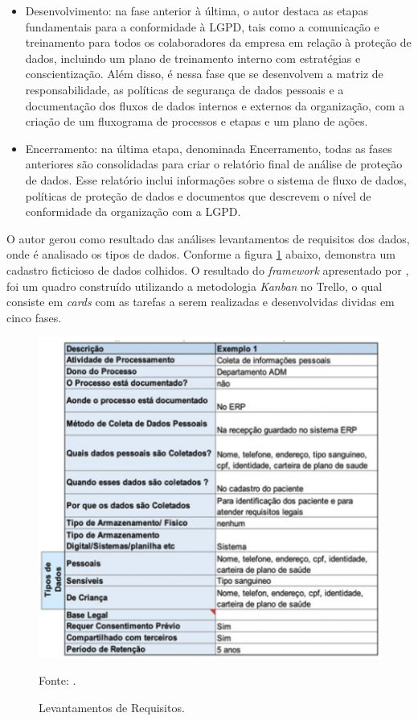 \documentclass[
	12pt,				%
	openright,			%
	oneside,			%
	a4paper,			%
	english,			%
	french,				%
	spanish,			%
	brazil,				%
	]{abntex2}
\begin{document}
\begin{itemize}
\item Desenvolvimento: na fase anterior à última, o autor destaca as etapas fundamentais para a conformidade à LGPD, tais como a comunicação e treinamento para todos os colaboradores da empresa em relação à proteção de dados, incluindo um plano de treinamento interno com estratégias e conscientização. Além disso, é nessa fase que se desenvolvem a matriz de responsabilidade, as políticas de segurança de dados pessoais e a documentação dos fluxos de dados internos e externos da organização, com a criação de um fluxograma de processos e etapas e um plano de ações.
\item Encerramento: na última etapa, denominada Encerramento, todas as fases anteriores são consolidadas para criar o relatório final de análise de proteção de dados. Esse relatório inclui informações sobre o sistema de fluxo de dados, políticas de proteção de dados e documentos que descrevem o nível de conformidade da organização com a LGPD.
\end{itemize}

O autor gerou como resultado das análises levantamentos de requisitos dos dados, onde é analisado os tipos de dados. Conforme a figura \ref{fig: silva21A} abaixo, demonstra um cadastro ficticioso de dados colhidos. 
O resultado do \textit{framework} apresentado por , foi um quadro construído utilizando a metodologia \textit{Kanban} no Trello, o qual consiste em \textit{cards} com as tarefas a serem realizadas e desenvolvidas dividas em cinco fases.

\begin{figure}[ht]
    \centering
    \caption{Levantamentos de Requisitos.}
    \includegraphics[width=5.0in]{Images/16Silva2021.png}
    \label{fig: silva21A}
    
    \centering \small Fonte: .
\end{figure}
\end{document}

